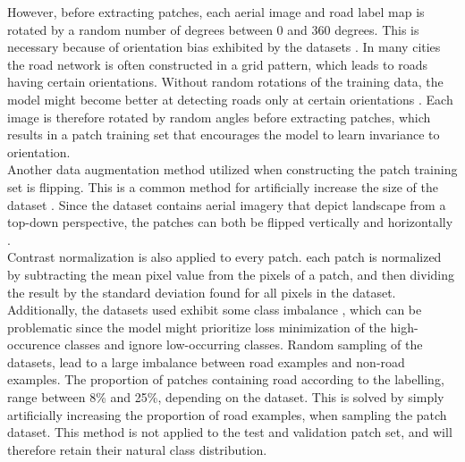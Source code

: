 However, before extracting patches, each aerial image and road label map is rotated by a random number of degrees between 0 and 360 degrees. This is necessary because of orientation bias exhibited by the datasets . In many cities the road network is often constructed in a grid pattern, which leads to roads having certain orientations. Without random rotations of the training data, the model might become better at detecting roads only at certain orientations \citep{Mnih_roads_high_res_aerial_images}. Each image is therefore rotated by random angles before extracting patches, which results in a patch training set that encourages the model to learn invariance to orientation.\\

Another data augmentation method utilized when constructing the patch training set is flipping. This is a common method for artificially increase the size of the dataset \citep{Krizhevsky_imagenet}. Since the dataset contains aerial imagery that depict landscape from a top-down perspective, the patches can both be flipped vertically and horizontally .\\

Contrast normalization is also applied to every patch. each patch is normalized by subtracting the mean pixel value from the pixels of a patch, and then dividing the result by the standard deviation found for all pixels in the dataset.\\

Additionally, the datasets used exhibit some class imbalance \citep{Japkowicz_class_imbalance}, which can be problematic since the model might prioritize loss minimization of the high-occurence classes and ignore low-occurring classes. Random sampling of the datasets, lead to a large imbalance between road examples and non-road examples. The proportion of patches containing road according to the labelling, range between 8\% and 25\%, depending on the dataset. This is solved by simply artificially increasing the proportion of road examples, when sampling the patch dataset. This method is not applied to the test and validation patch set, and will therefore retain their natural class distribution.\\